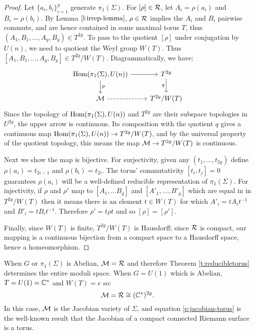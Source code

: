 	\begin{proof}
		Let $\{a_i,b_i\}_{i=1}^{g}$ generate $\pi_1(\Sigma)$. For $[\rho]\in \mathcal{R}$, let $A_i = \rho(a_i)$ and $B_i = \rho(b_i)$. By Lemma $\ref{l:irrep-lemma}$, $\rho\in \mathcal{R}$ implies the $A_i$ and $B_i$ pairwise commute, and are hence contained in some maximal torus $T$, thus $(A_1,B_1,...,A_g,B_g)\in T^{2g}$. To pass to the quotient $[\rho]$ under conjugation by $U(n)$, we need to quotient the Weyl group $W(T)$. Thus $[A_1,B_1,...,A_g,B_g] \in T^{2g}/W(T)$. Diagrammatically, we have:
		\[\begin{tikzcd}
		{\Hom(\pi_1(\Sigma),U(n))} & {T^{2g}} \\
		\MM & {T^{2g}/W(T)}
		\arrow["p", from=1-1, to=2-1]
		\arrow[from=1-1, to=1-2]
		\arrow["q"', from=1-2, to=2-2]
		\arrow[dashed, from=2-1, to=2-2]
		\end{tikzcd}\]
		Since the topology of $\text{Hom}(\pi_1(\Sigma),U(n))$ and $T^{2g}$ are their subspace topologies in $U^{2g}$, the upper arrow is continuous. Its composition with the quotient $q$ gives a continuous map $\text{Hom}(\pi_1(\Sigma), U(n))\to T^{2g}/W(T)$, and by the universal property of the quotient topology, this means the map $\mathcal{M}\to T^{2g}/W(T)$ is continuous.
		
		Next we show the map is bijective. For surjectivity, given any $(t_1,...,t_{2g})$ define $\rho(a_i) = t_{2i-1}$ and $\rho(b_i) = t_{2i}$. The torus' commutativity $[t_i,t_j]=0$ guarantees $\rho(a_i)$ will be a well-defined reducible representation of $\pi_1(\Sigma)$. For injectivity, if $\rho$ and $\rho'$ map to $[A_1,...B_g]$ and $[A'_1,...,B'_g]$ which are equal in in $T^{2g}/W(T)$ then it means there is an element $t\in W(T)$ for which $A'_i = tA_it^{-1}$ and $B'_i = tB_i t^{-1}$. Therefore $\rho' = t\rho t$ and so $[\rho]=[\rho']$.
		
		Finally, since $W(T)$ is finite, $T^{2g}/W(T)$ is Hausdorff; since $\mathcal{R}$ is compact, our mapping is a continuous bijection from a compact space to a Hausdorff space, hence a homeomorphism.
	\end{proof}
	When $G$ or $\pi_1(\Sigma)$ is Abelian, $\mathcal{M} = \mathcal{R}$ and therefore Theorem \ref{t:reducibletorus} determines the entire moduli space. When $G=U(1)$ which is Abelian, $T = U(1) = \mathbb{C}^{\ast}$ and $W(T) = {e}$ so:
	\begin{equation}
		\label{e:jacobian-torus}
		\mathcal{M} = \mathcal{R} \cong (\mathbb{C}^{\ast})^{2g}.
	\end{equation}
	In this case, $\mathcal{M}$ is the Jacobian variety of $\Sigma$, and equation \ref{e:jacobian-torus} is the well-known result that the Jacobian of a compact connected Riemann surface is a torus. 
	
